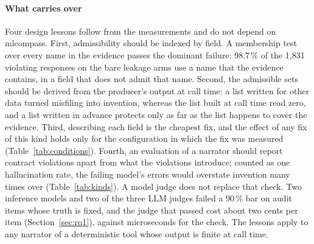 \documentclass[10pt,twocolumn]{article}
\begin{document}
\paragraph{What carries over}
Four design lessons follow from the measurements and do not depend on
mlcompass. First, admissibility should be indexed by field. A membership test
over every name in the evidence passes the dominant failure: 98.7\,\% of the
1{,}831 violating responses on the bare leakage arms use a name that the evidence
contains, in a field that does not admit that name. Second, the admissible
sets should be derived from the producer's output at call time: a list written
for other data turned misfiling into invention, whereas the list built at call
time read zero, and a list written in advance protects only as far as the list
happens to cover the evidence. Third, describing each field is the cheapest fix, and the
effect of any fix of this kind holds only for the configuration in which the fix was measured (Table~\ref{tab:conditions}). Fourth, an evaluation of a narrator
should report contract violations apart from what the violations introduce;
counted as one hallucination rate, the failing model's errors would overstate
invention many times over (Table~\ref{tab:kinds}). A model judge does not
replace that check. Two inference models and two of the three LLM judges failed
a 90\,\% bar on audit items whose truth is fixed, and the judge that passed
cost about two cents per item (Section~\ref{sec:rq1}), against microseconds for
the check. The
lessons apply to any narrator of a deterministic tool whose output is finite at
call time.
\end{document}

